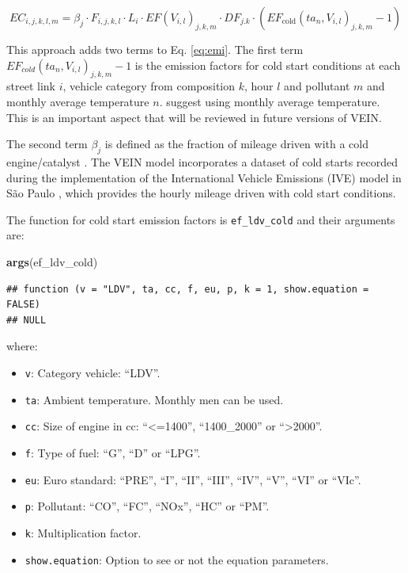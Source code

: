 \documentclass[12pt,graybox,envcountchap,sectrefs]{krantz}
\makeatletter
\newenvironment{Shaded}{\begin{snugshade}}{\end{snugshade}}
\newcommand{\KeywordTok}[1]{\textcolor[rgb]{0.13,0.29,0.53}{\textbf{#1}}}
\newcommand{\NormalTok}[1]{#1}
\providecommand{\tightlist}{%
  \setlength{\itemsep}{0pt}\setlength{\parskip}{0pt}}
\newenvironment{kframe}{%
\medskip{}
\setlength{\fboxsep}{.8em}
 \def\at@end@of@kframe{}%
 \ifinner\ifhmode%
  \def\at@end@of@kframe{\end{minipage}}%
  \begin{minipage}{\columnwidth}%
 \fi\fi%
 \def\FrameCommand##1{\hskip\@totalleftmargin \hskip-\fboxsep
 \colorbox{shadecolor}{##1}\hskip-\fboxsep
     \hskip-\linewidth \hskip-\@totalleftmargin \hskip\columnwidth}%
 \MakeFramed {\advance\hsize-\width
   \@totalleftmargin\z@ \linewidth\hsize
   \@setminipage}}%
 {\par\unskip\endMakeFramed%
 \at@end@of@kframe}
\renewenvironment{Shaded}{\begin{kframe}}{\end{kframe}}
\theoremstyle{definition}
\theoremstyle{definition}
\theoremstyle{definition}
\theoremstyle{remark}
\makeatother
\begin{document}
\begin{equation}
EC_{i,j,k,l,m} =\beta_{j} \cdot F_{i,j,k,l} \cdot L_i \cdot EF(V_{i,l})_{j,k,m} \cdot DF_{j.k} \cdot \left(EF_{\mbox{cold}}(ta_n,V_{i,l})_{j,k,m}-1\right)
\label{eq:cold}
\end{equation}

This approach adds two terms to Eq. \ref{eq:emi}. The first term
\(EF_{cold}(ta_n,V_{i,l})_{j,k,m}-1\) is the emission factors for cold
start conditions at each street link \(i\), vehicle category from
composition \(k\), hour \(l\) and pollutant \(m\) and monthly average
temperature \(n\). \citep{NtziachristosSamaras2016} suggest using
monthly average temperature. This is an important aspect that will be
reviewed in future versions of VEIN.

The second term \(\beta_j\) is defined as the fraction of mileage driven
with a cold engine/catalyst \citep{NtziachristosSamaras2016}. The VEIN
model incorporates a dataset of cold starts recorded during the
implementation of the International Vehicle Emissions (IVE) model
\citep{Davisetal2005} in São Paulo \citep{ivesp}, which provides the
hourly mileage driven with cold start conditions.

The function for cold start emission factors is \texttt{ef\_ldv\_cold}
and their arguments are:

\begin{Shaded}
\begin{Highlighting}[]
\KeywordTok{args}\NormalTok{(ef_ldv_cold)}
\end{Highlighting}
\end{Shaded}

\begin{verbatim}
## function (v = "LDV", ta, cc, f, eu, p, k = 1, show.equation = FALSE) 
## NULL
\end{verbatim}

where:

\begin{itemize}
\tightlist
\item
  \texttt{v}: Category vehicle: ``LDV''.
\item
  \texttt{ta}: Ambient temperature. Monthly men can be used.
\item
  \texttt{cc}: Size of engine in cc: ``\textless{}=1400'',
  ``1400\_2000'' or ``\textgreater{}2000''.
\item
  \texttt{f}: Type of fuel: ``G'', ``D'' or ``LPG''.
\item
  \texttt{eu}: Euro standard: ``PRE'', ``I'', ``II'', ``III'', ``IV'',
  ``V'', ``VI'' or ``VIc''.
\item
  \texttt{p}: Pollutant: ``CO'', ``FC'', ``NOx'', ``HC'' or ``PM''.
\item
  \texttt{k}: Multiplication factor.
\item
  \texttt{show.equation}: Option to see or not the equation parameters.
\end{itemize}
\end{document}
